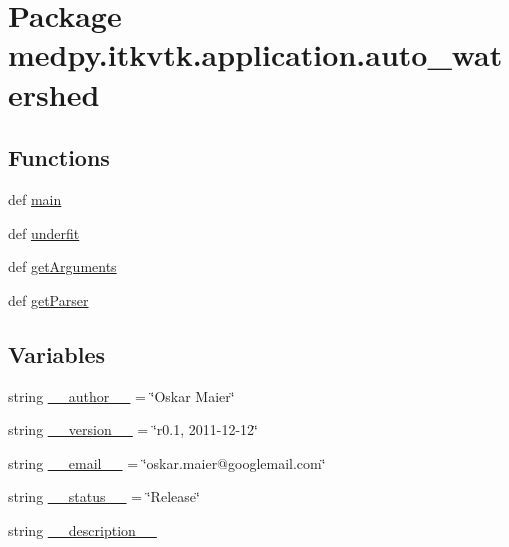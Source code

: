 \hypertarget{namespacemedpy_1_1itkvtk_1_1application_1_1auto__watershed}{
\section{Package medpy.itkvtk.application.auto\_\-watershed}
\label{namespacemedpy_1_1itkvtk_1_1application_1_1auto__watershed}
}
\subsection*{Functions}
\begin{DoxyCompactItemize}
\item 
def \hyperlink{namespacemedpy_1_1itkvtk_1_1application_1_1auto__watershed_a7204443cef0afb17472ef26122cba820}{main}
\item 
def \hyperlink{namespacemedpy_1_1itkvtk_1_1application_1_1auto__watershed_a7b7ad84cc009fe68bab76fc9f3738e93}{underfit}
\item 
def \hyperlink{namespacemedpy_1_1itkvtk_1_1application_1_1auto__watershed_ac7f81b8bcaa9d618a14b4f866fe0f04b}{getArguments}
\item 
def \hyperlink{namespacemedpy_1_1itkvtk_1_1application_1_1auto__watershed_a6969722cc71fc1647e3066b355b6795d}{getParser}
\end{DoxyCompactItemize}
\subsection*{Variables}
\begin{DoxyCompactItemize}
\item 
string \hyperlink{namespacemedpy_1_1itkvtk_1_1application_1_1auto__watershed_a4dbafa4f88d0a5e505750d662b8a0ced}{\_\-\_\-author\_\-\_\-} = \char`\"{}Oskar Maier\char`\"{}
\item 
string \hyperlink{namespacemedpy_1_1itkvtk_1_1application_1_1auto__watershed_ac6e0ca8721a36b97a575c42d46f3a164}{\_\-\_\-version\_\-\_\-} = \char`\"{}r0.1, 2011-\/12-\/12\char`\"{}
\item 
string \hyperlink{namespacemedpy_1_1itkvtk_1_1application_1_1auto__watershed_aedf8e52f6d377bd1b73b4c87c954d12f}{\_\-\_\-email\_\-\_\-} = \char`\"{}oskar.maier@googlemail.com\char`\"{}
\item 
string \hyperlink{namespacemedpy_1_1itkvtk_1_1application_1_1auto__watershed_aeab728ee24c394a2ae904e5ab8defeb2}{\_\-\_\-status\_\-\_\-} = \char`\"{}Release\char`\"{}
\item 
string \hyperlink{namespacemedpy_1_1itkvtk_1_1application_1_1auto__watershed_aba71d5ed7cfbc51114697ad6039219d8}{\_\-\_\-description\_\-\_\-}
\end{DoxyCompactItemize}


